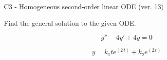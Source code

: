 \begin{exercise}
  \begin{exerciseTitle}C3 - Homogeneous second-order linear ODE (ver. 13)\end{exerciseTitle}
  \begin{exerciseStatement}
    
Find the general solution to the given ODE.

    
\[y''-4y'+4y = 0\]

  \end{exerciseStatement}
  \begin{exerciseAnswer}
    
\[y= k_{1} t e^{\left(2 \, t\right)} + k_{2} e^{\left(2 \, t\right)}\]

  \end{exerciseAnswer}
\end{exercise}